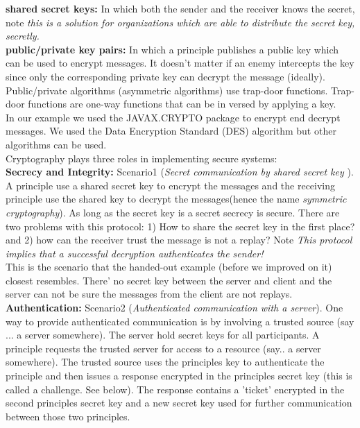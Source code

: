  \textbf{shared secret keys:} In which both the sender and the receiver knows the secret, note \textit{this is a solution for organizations which are able to distribute the secret key, secretly.}\\

\textbf{public/private key pairs:} In which a principle publishes a public key which can be used to encrypt messages. It doesn't matter if an enemy intercepts the key since only the corresponding private key can decrypt the message (ideally). Public/private algorithms (asymmetric algorithms) use trap-door functions. Trap-door functions are one-way functions that can be in versed by applying a key.  \\


In our example we used the JAVAX.CRYPTO package to encrypt end decrypt messages. We used the Data Encryption Standard (DES) algorithm but other algorithms can be used.\\

Cryptography plays three roles in implementing secure systems:\\

\textbf{Secrecy and Integrity:} Scenario1 (\textit{Secret communication by shared secret key }). A principle use a shared secret key to encrypt the messages and the receiving principle use the shared key to decrypt the messages(hence the name \textit{symmetric cryptography}). As long as the secret key is a secret secrecy is secure. There are two problems with this protocol: 1) How to share the secret key in the first place? and 2) how can the receiver trust the message is not a replay? Note \textit{This protocol implies that a successful decryption authenticates the sender!} \\

This is the scenario that the handed-out example (before we improved on it) closest resembles. There' no secret key between the server and client and the server can not be sure the messages from the client are not replays. \\

\textbf{Authentication:} Scenario2 (\textit{Authenticated communication with a server}). One way to provide authenticated communication is by involving a trusted source (say ... a server somewhere). The server hold secret keys for all participants. A principle requests the trusted server for access to a resource (say.. a server somewhere). The trusted source uses the principles key to authenticate the principle and then issues a response encrypted in the principles secret key (this is called a challenge. See below). The response contains a 'ticket' encrypted in the second principles secret key and a new secret key used for further communication between those two principles. \\ 

